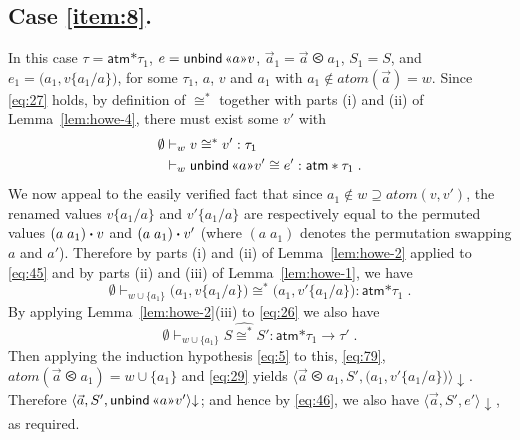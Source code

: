 \documentclass{LMCS}
\theoremstyle{plain}
\theoremstyle{definition}
\newcommand{\act}{\mathbin{\mbox{\boldmath$\cdot$}}}
\newcommand{\atm}[1][a]{#1}
\newcommand{\ATM}{\kw{atm}}
\newcommand{\atoms}{\mathit{atom}}
\newcommand{\BINDVAL}[2]{\mathopen{\text{\normalfont\guillemotleft}}#1
  \mathclose{\text{\normalfont\guillemotright}}#2}
\newcommand{\config}[3]{\langle#1, #2, #3\rangle}
\newcommand{\CR}[1]{\mathrel{\widehat{#1}}}
\newcommand{\ent}{\vdash}
\renewcommand{\exp}[1][e]{#1}
\newcommand{\FUNTY}{\mathbin{\rightarrow}}
\newcommand{\LP}{\mathopen{\kw{(}}}
\newcommand{\kw}[1]{\mathsf{#1}}
\newcommand{\ofty}{:}
\newcommand{\opeq}{\cong}
\newcommand{\ords}{\olessthan}\newcommand{\PAIR}[2]{\LP#1\mathbin{\kw{,}}#2\RP}
\newcommand{\PRODTY}{\mathbin{\kw{*}}}
\newcommand{\rename}[2]{\{#2/#1\}}
\newcommand{\RP}{\mathclose{\kw{)}}}
\newcommand{\s}[1][a]{\vec{#1}}
\newcommand{\stk}[1][S]{#1}
\newcommand{\swap}[2]{(#1\;#2)}
\newcommand{\terminates}[1][]{{\downarrow_{#1}}}
\newcommand{\ty}{\tau}
\newcommand{\UNBIND}{\kw{unbind}}
\newcommand{\val}[1][v]{#1}
\newcommand{\w}[1][w]{#1}
\begin{document}
  \subsection*{Case \ref{item:8}.} In this case $\ty=\ATM\PRODTY\ty_1$,
  $\exp=\UNBIND\,\BINDVAL{\atm}{\val}$, $\s_1=\s\ords a_1$,
  $\stk_1=\stk$, and
  $\exp_1=\PAIR{\atm_1}{\val\rename{\atm}{\atm_1}}$, for some $\ty_1$,
  $\atm$, $\val$ and $\atm_1$ with $\atm_1\notin\atoms(\s)=\w$. Since
  \eqref{eq:27} holds, by definition of $\opeq^*$ together with parts
  (i) and (ii) of Lemma~\ref{lem:howe-4}, there must exist some
  $\val'$ with
  \begin{align}
    \emptyset &\ent_{\w} \val \opeq^* \val'\ofty\ty_1 \label{eq:45}\\
    {} &\ent_{\w} \UNBIND\,\BINDVAL{\atm}{\val'}\opeq 
    \exp' \ofty \ATM\PRODTY\ty_1\;. \label{eq:46}
  \end{align}
  We now appeal to the easily verified fact that since
  $\atm_1\notin\w\supseteq\atoms(\val,\val')$, the renamed values
  $\val\rename{\atm}{\atm_1}$ and $\val'\rename{\atm}{\atm_1}$ are
  respectively equal to the permuted values
  $\swap{\atm}{\atm_1}\act\val$ and $\swap{\atm}{\atm_1}\act \val'$
  (where $\swap{\atm}{\atm_1}$ denotes the permutation swapping $\atm$
  and $\atm'$).  Therefore by parts (i) and (ii) of
  Lemma~\ref{lem:howe-2} applied to \eqref{eq:45} and by parts (ii)
  and (iii) of Lemma~\ref{lem:howe-1}, we have
  \begin{equation}
    \label{eq:79}
    \emptyset\ent_{\w\cup\{\atm_1\}} 
    \PAIR{\atm_1}{\val\rename{\atm}{\atm_1}} \opeq^*
    \PAIR{\atm_1}{\val'\rename{\atm}{\atm_1}} \ofty\ATM\PRODTY\ty_1\;.
  \end{equation}
  By applying Lemma~\ref{lem:howe-2}(iii) to \eqref{eq:26} we also
  have
  \[
  \emptyset\ent_{\w\cup\{\atm_1\}} \stk\CR{\opeq^*}\stk'
  \ofty\ATM\PRODTY\ty_1\FUNTY\ty'\;.
  \]
  Then applying the induction hypothesis \eqref{eq:5} to this,
  \eqref{eq:79}, $\atoms(\s\ords\atm_1) = \w\cup\{\atm_1\}$ and
  \eqref{eq:29} yields $\config{\s\ords\atm_1}{\stk'}{\PAIR{\atm_1}
    {\val'\rename{\atm}{\atm_1}}}\terminates$.  Therefore
  $\config{\s}{\stk'}{\UNBIND\,\BINDVAL{\atm}{\val'}}\terminates$; and
  hence by \eqref{eq:46}, we also have
  $\config{\s}{\stk'}{e'}\terminates$, as required.
\end{document}
